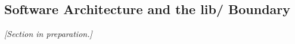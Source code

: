 \subsection{Software Architecture and the lib/ Boundary}
\label{sec:architecture}

\emph{[Section in preparation.]}

